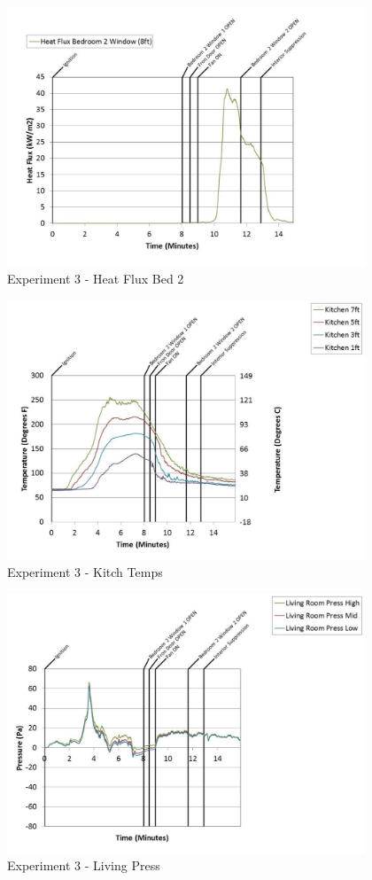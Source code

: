 \documentclass{article}
\begin{document}
\begin{appendices}
	\begin{figure}[h!]
		\centering
		\includegraphics[height=3.05in]{0_Images/Results_Charts/Exp_3_Charts/HeatFluxBed2.pdf}
		\caption{Experiment 3 - Heat Flux Bed 2}
	\end{figure}
 
	\clearpage

	\begin{figure}[h!]
		\centering
		\includegraphics[height=3.05in]{0_Images/Results_Charts/Exp_3_Charts/KitchTemps.pdf}
		\caption{Experiment 3 - Kitch Temps}
	\end{figure}
 

	\begin{figure}[h!]
		\centering
		\includegraphics[height=3.05in]{0_Images/Results_Charts/Exp_3_Charts/LivingPress.pdf}
		\caption{Experiment 3 - Living Press}
	\end{figure}
 

\end{appendices}
\end{document}

